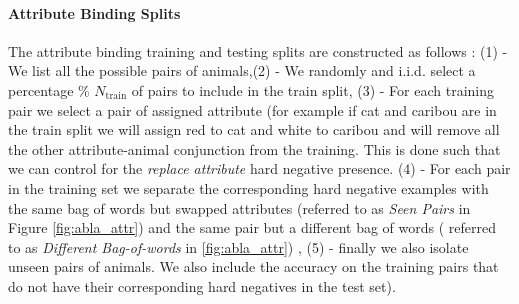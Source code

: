 \paragraph{Attribute Binding Splits} The attribute binding training and testing splits are constructed as follows : (1) - We list all the possible pairs of animals,(2) - We randomly  and i.i.d. select a percentage \%  $N_{\text{train}}$ of pairs to include in the train split, (3) - For each training pair we select a pair of assigned attribute (for example if cat and caribou are in the train split we will assign red to cat and white to caribou and will remove all the other attribute-animal conjunction from the training. This is done such that we can control for the \emph{replace attribute} hard negative presence. (4) - For each pair in the training set we separate the corresponding hard negative examples with the same bag of words but swapped attributes (referred to as \emph{Seen Pairs} in Figure \ref{fig:abla_attr}) and the same pair but a different bag of words ( referred to as \emph{Different Bag-of-words} in \ref{fig:abla_attr})  , (5) - finally we also isolate unseen pairs of animals. We also include the accuracy on the training pairs that do not have their corresponding hard negatives in the test set).
